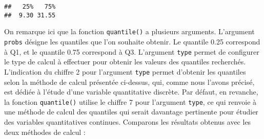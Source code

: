 \documentclass[
  french,
]{book}
\begin{document}
\begin{verbatim}
##   25%   75% 
##  9.30 31.55
\end{verbatim}

On remarque ici que la fonction \texttt{quantile()} a plusieurs arguments. L'argument \texttt{probs} désigne les quantiles que l'on souhaite obtenir. Le quantile 0.25 correspond à Q1, et le quantile 0.75 correspond à Q3. L'argument \texttt{type} permet de configurer le type de calcul à effectuer pour obtenir les valeurs des quantiles recherchés. L'indication du chiffre 2 pour l'argument \texttt{type} permet d'obtenir les quantiles selon la méthode de calcul présentée ci-dessus, qui, comme nous l'avons précisé, est dédiée à l'étude d'une variable quantitative discrète. Par défaut, en revanche, la fonction \texttt{quantile()} utilise le chiffre 7 pour l'argument \texttt{type}, ce qui renvoie à une méthode de calcul des quantiles qui serait davantage pertinente pour étudier des variables quantitatives continues. Comparons les résultats obtenus avec les deux méthodes de calcul :

\providecommand{\docline}[3]{\noalign{\global\setlength{\arrayrulewidth}{#1}}\arrayrulecolor[HTML]{#2}\cline{#3}}

\setlength{\tabcolsep}{2pt}

\renewcommand*{\arraystretch}{1.5}
\end{document}
